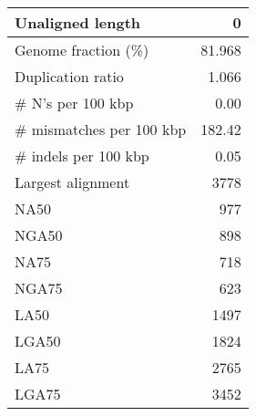 \documentclass[12pt,a4paper]{article}
\begin{document}
\begin{table}[ht]
\begin{center}
\begin{tabular}{|l*{1}{|r}|}
Unaligned length & 0 \\ \hline
Genome fraction (\%) & 81.968 \\ \hline
Duplication ratio & 1.066 \\ \hline
\# N's per 100 kbp & 0.00 \\ \hline
\# mismatches per 100 kbp & 182.42 \\ \hline
\# indels per 100 kbp & 0.05 \\ \hline
Largest alignment & 3778 \\ \hline
NA50 & 977 \\ \hline
NGA50 & 898 \\ \hline
NA75 & 718 \\ \hline
NGA75 & 623 \\ \hline
LA50 & 1497 \\ \hline
LGA50 & 1824 \\ \hline
LA75 & 2765 \\ \hline
LGA75 & 3452 \\ \hline
\end{tabular}
\end{center}
\end{table}
\end{document}
